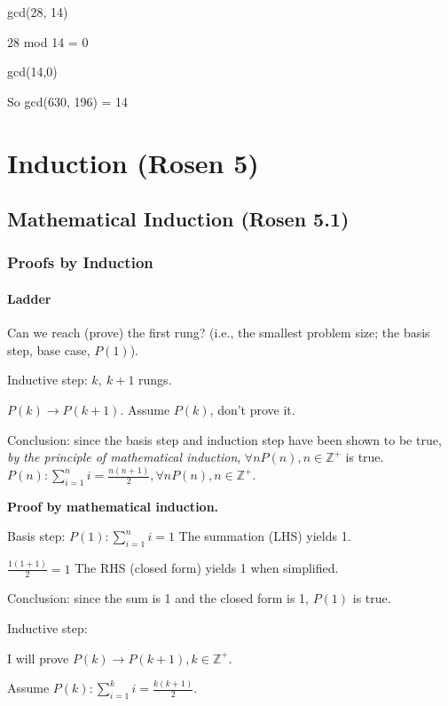 \documentclass[english,openany]{book}
\begin{document}
    gcd(28, 14)

    28 mod 14 = 0

    gcd(14,0)

    So gcd(630, 196) = 14

    \chapter{Induction (Rosen 5)}

    \section{Mathematical Induction (Rosen 5.1)}

    \subsection{Proofs by Induction}

    \subsubsection{Ladder}

    Can we reach (prove) the first rung? (i.e., the smallest problem size; the basis step, base case, $P(1)$).

    Inductive step: $k,\ k+1$ rungs.

    $P(k) \rightarrow P(k+1)$. Assume $P(k)$, don't prove it.

    Conclusion: since the basis step and induction step have been shown to be true, \textit{by the principle of mathematical induction}, $\forall n P(n), n \in \mathbb Z^+$ is true. \\

    $P(n): \sum_{i=1}^{n} i = \frac{n(n+1)}{2}, \forall n P(n), n \in \mathbb Z^+$.

    \textbf{Proof by mathematical induction.}

    Basis step: $P(1): \sum_{i=1}^{n} i = 1$ The summation (LHS) yields 1.

    $\frac{1(1+1)}{2} = 1$ The RHS (closed form) yields 1 when simplified.

    Conclusion: since the sum is 1 and the closed form is 1, $P(1)$ is true.

    Inductive step:

    I will prove $P(k) \rightarrow P(k+1), k \in \mathbb Z^+$.

    Assume $P(k): \sum_{i=1}^{k} i = \frac{k(k+1)}{2}$.
\end{document}
